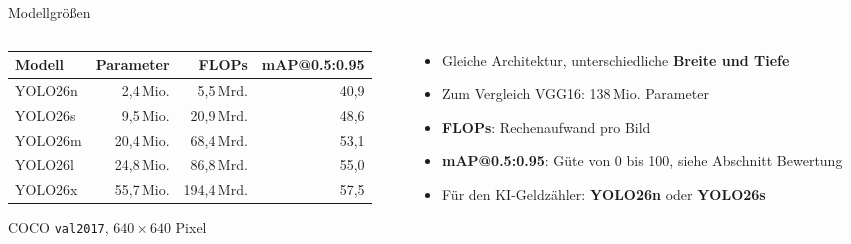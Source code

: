 \begin{frame}{Modellgrößen}
\footnotesize
\begin{columns}
\begin{column}{0.60\textwidth}
\centering
\begin{tabular}{lrrr}
\toprule
\textbf{Modell} & \textbf{Parameter} & \textbf{FLOPs} & \textbf{mAP@0.5:0.95} \\
\midrule
YOLO26n & 2,4\,Mio. & 5,5\,Mrd. & 40,9 \\
YOLO26s & 9,5\,Mio. & 20,9\,Mrd. & 48,6 \\
YOLO26m & 20,4\,Mio. & 68,4\,Mrd. & 53,1 \\
YOLO26l & 24,8\,Mio. & 86,8\,Mrd. & 55,0 \\
YOLO26x & 55,7\,Mio. & 194,4\,Mrd. & 57,5 \\
\bottomrule
\end{tabular}

\vspace{0.5em}
COCO \texttt{val2017}, $640 \times 640$ Pixel
\end{column}
\begin{column}{0.35\textwidth}
\begin{itemize}
  \item Gleiche Architektur, unterschiedliche \textbf{Breite und Tiefe}
  \item Zum Vergleich VGG16: 138\,Mio. Parameter
  \item \textbf{FLOPs}: Rechenaufwand pro Bild
  \item \textbf{mAP@0.5:0.95}: Güte von 0 bis 100, siehe Abschnitt Bewertung
  \item Für den KI-Geldzähler: \textbf{YOLO26n} oder \textbf{YOLO26s}
\end{itemize}
\end{column}
\end{columns}


\end{frame}
